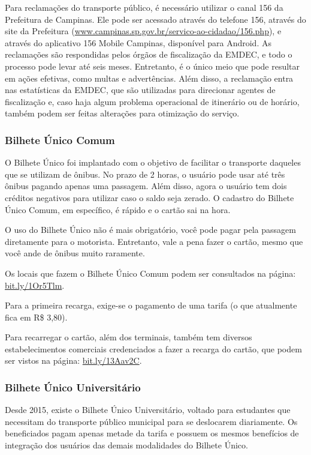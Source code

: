 Para reclamações do transporte público, é necessário utilizar o canal 156 da
Prefeitura de Campinas. Ele pode ser acessado através do telefone 156, através
do site da Prefeitura (\url{www.campinas.sp.gov.br/servico-ao-cidadao/156.php}),
e através do aplicativo 156 Mobile Campinas, disponível para Android. As
reclamações são respondidas pelos órgãos de fiscalização da EMDEC, e todo o
processo pode levar até seis meses. Entretanto, é o único meio que pode resultar
em ações efetivas, como multas e advertências. Além disso, a reclamação entra
nas estatísticas da EMDEC, que são utilizadas para direcionar agentes de
fiscalização e, caso haja algum problema operacional de itinerário ou de
horário, também podem ser feitas alterações para otimização do serviço.

\subsubsection{Bilhete Único Comum}

O Bilhete Único foi implantado com o objetivo de facilitar o transporte daqueles
que se utilizam de ônibus. No prazo de 2 horas, o usuário pode usar até três
ônibus pagando apenas uma passagem. Além disso, agora o usuário tem dois
créditos negativos para utilizar caso o saldo seja zerado. O cadastro do
Bilhete Único Comum, em específico, é rápido e o cartão sai na hora.

O uso do Bilhete Único não é mais obrigatório, você pode pagar pela passagem
diretamente para o motorista. Entretanto, vale a pena fazer o cartão, mesmo
que você ande de ônibus muito raramente.

Os locais que fazem o Bilhete Único Comum podem ser consultados na página: 
\url{bit.ly/1Or5Tlm}.

Para a primeira recarga, exige-se o pagamento de uma tarifa (o que atualmente
fica em R\$ 3,80).

Para recarregar o cartão, além dos terminais, também tem diversos
estabelecimentos comerciais credenciados a fazer a recarga do cartão, que podem
ser vistos na página: \url{bit.ly/13Aav2C}.

\subsubsection{Bilhete Único Universitário}

Desde 2015, existe o Bilhete Único Universitário, voltado para estudantes que
necessitam do transporte público municipal para se deslocarem diariamente. Os
beneficiados pagam apenas metade da tarifa e possuem os mesmos benefícios de
integração dos usuários das demais modalidades do Bilhete Único.

